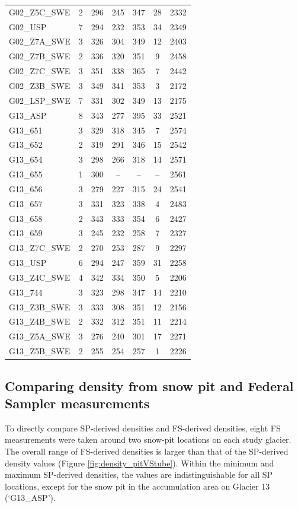 \documentclass{sfuthesis}
\begin{document}
\begin{table}
\begin{tabular}{lcccccc}
G02\_Z5C\_SWE & 2 & 296 & 245 & 347 & 28 & 2332 \\
G02\_USP & 7 & 294 & 232 & 353 & 34  & 2349\\
G02\_Z7A\_SWE & 3 & 326 & 304 & 349 & 12  & 2403\\
G02\_Z7B\_SWE & 2 & 336 & 320 & 351 & 9 & 2458 \\
G02\_Z7C\_SWE & 3 & 351 & 338 & 365 & 7 & 2442 \\
G02\_Z3B\_SWE & 3 & 349 & 341 & 353 & 3  & 2172\\
G02\_LSP\_SWE & 7 & 331 & 302 & 349 & 13 & 2175 \\ \hline
G13\_ASP & 8 & 343 & 277 & 395 & 33  & 2521\\
G13\_651 & 3 & 329 & 318 & 345 & 7  & 2574\\
G13\_652 & 2 & 319 & 291 & 346 & 15  & 2542\\
G13\_654 & 3 & 298 & 266 & 318 & 14  & 2571\\
G13\_655 & 1 & 300 &-- & -- & --  & 2561\\
G13\_656 & 3 & 279 & 227 & 315 & 24  & 2541\\
G13\_657 & 3 & 331 & 323 & 338 & 4  & 2483\\
G13\_658 & 2 & 343 & 333 & 354 & 6  & 2427\\
G13\_659 & 3 & 245 & 232 & 258 & 7 & 2327 \\
G13\_Z7C\_SWE & 2 & 270 & 253 & 287 & 9  & 2297\\
G13\_USP & 6 & 294 & 247 & 359 & 31  & 2258\\
G13\_Z4C\_SWE & 4 & 342 & 334 & 350 & 5 & 2206 \\
G13\_744 & 3 & 323 & 298 & 347 & 14 & 2210 \\
G13\_Z3B\_SWE & 3 & 333 & 308 & 351 & 12 & 2156 \\
G13\_Z4B\_SWE & 2 & 332 & 312 & 351 & 11  & 2214\\
G13\_Z5A\_SWE & 3 & 276 & 240 & 301 & 17  & 2271\\
G13\_Z5B\_SWE & 2 & 255 & 254 & 257 & 1 & 2226
\end{tabular}
\end{table}

\subsection{Comparing density from snow pit and Federal Sampler measurements}

To directly compare SP-derived densities and FS-derived densities, eight FS measurements were taken around two snow-pit locations on each study glacier.  The overall range of FS-derived densities is larger than that of the SP-derived density values (Figure \ref{fig:density_pitVStube}). Within the minimum and maximum SP-derived densities, the values are indistinguishable for all SP locations, except for the snow pit in the accumulation area on Glacier 13 (`G13\_ASP').
\end{document}
